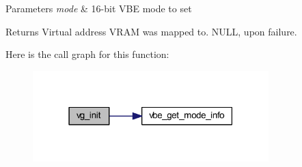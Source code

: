 \begin{DoxyParams}{Parameters}
{\em mode} & 16-\/bit V\+BE mode to set \\
\hline
\end{DoxyParams}
\begin{DoxyReturn}{Returns}
Virtual address V\+R\+AM was mapped to. N\+U\+LL, upon failure. 
\end{DoxyReturn}
Here is the call graph for this function\+:
\nopagebreak
\begin{figure}[H]
\begin{center}
\leavevmode
\includegraphics[width=259pt]{group__video__gr_gacef21667c79365d57a084bed994c2189_cgraph}
\end{center}
\end{figure}

